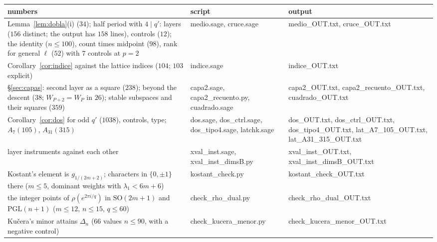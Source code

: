 \documentclass[11pt,a4paper]{article}
\theoremstyle{definition}
\begin{document}
\begin{center}\footnotesize
{}
\begin{tabular}{p{}p{}p{}}
\toprule
numbers & script & output \\
\midrule
Lemma~\ref{lem:dobla}(i) ($34$); half period with $4\mid q'$: layers ($156$ distinct; the output has $158$ lines), controls ($12$); the identity ($n\le100$), count times midpoint ($98$), rank for general $\ell$ ($52$) with $7$ controls at $p=2$ & {\ttfamily\footnotesize medio.sage, cruce.sage} & {\ttfamily\footnotesize medio\_OUT.txt, \allowbreak cruce\_OUT.txt} \\
Corollary~\ref{cor:indice} against the lattice indices ($104$; $103$ explicit) & {\ttfamily\footnotesize indice.sage} & {\ttfamily\footnotesize indice\_OUT.txt} \\
\S\ref{sec:capas}: second layer as a square ($238$); beyond the descent ($38$; $W_{P+2}=W_P$ in $26$); stable subspaces and their squares ($359$) & {\ttfamily\footnotesize capa2.sage, capa2\_recuento.py, cuadrado.sage} & {\ttfamily\footnotesize capa2\_OUT.txt, \allowbreak capa2\_recuento\_OUT.txt, \allowbreak cuadrado\_OUT.txt} \\
Corollary~\ref{cor:dos} for odd $q'$ ($1038$), controls, type; $A_7(105)$, $A_{31}(315)$ & {\ttfamily\footnotesize dos.sage, dos\_ctrl.sage, dos\_tipo4.sage, latchk.sage} & {\ttfamily\footnotesize dos\_OUT.txt, \allowbreak dos\_ctrl\_OUT.txt, \allowbreak dos\_tipo4\_OUT.txt, \allowbreak lat\_A7\_105\_OUT.txt, \allowbreak lat\_A31\_315\_OUT.txt} \\
layer instruments against each other & {\ttfamily\footnotesize xval\_inst.sage, xval\_inst\_dimsB.py} & {\ttfamily\footnotesize xval\_inst\_OUT.txt, \allowbreak xval\_inst\_dimsB\_OUT.txt} \\
Kostant's element is $g_{1/(2m+2)}$; characters in $\{0,\pm1\}$ there ($m\le5$, dominant weights with $\lambda_1<6m+6$) & {\ttfamily\footnotesize kostant\_check.py} & {\ttfamily\footnotesize kostant\_check\_OUT.txt} \\
the integer points of $\rho(e^{2\pi i/q})$ in $\mathrm{SO}(2m+1)$ and $\mathrm{PGL}(n+1)$ ($m\le12$, $n\le15$, $q\le60$) & {\ttfamily\footnotesize check\_rho\_dual.py} & {\ttfamily\footnotesize check\_rho\_dual\_OUT.txt} \\
Kučera's minor attains $\Delta_n$ ($66$ values $n\le90$, with a negative control) & {\ttfamily\footnotesize check\_kucera\_menor.py} & {\ttfamily\footnotesize check\_kucera\_menor\_OUT.txt} \\

\end{tabular}
\end{center}
\end{document}
